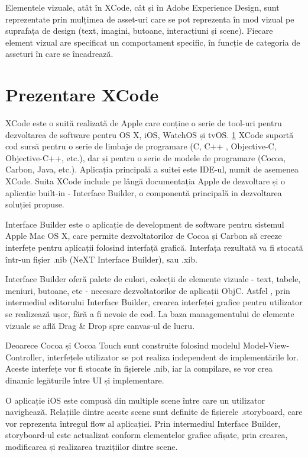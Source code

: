 Elementele vizuale, atât în XCode, cât și în Adobe Experience Design, sunt reprezentate prin mulțimea de asset-uri care se pot reprezenta în mod vizual pe suprafața de design (text, imagini, butoane, interacțiuni și scene). Fiecare element vizual are specificat un comportament specific, în funcție de categoria de asseturi în care se încadrează.

\section{Prezentare XCode}

XCode este o suită realizată de Apple care conține o serie de tool-uri pentru dezvoltarea de software pentru OS X, iOS, WatchOS și tvOS. \ref{} XCode suportă cod sursă pentru o serie de limbaje de programare (C, C++ , Objective-C, Objective-C++, etc.), dar și pentru o serie de modele de programare (Cocoa, Carbon, Java, etc.). Aplicația principală a suitei este IDE-ul, numit de asemenea XCode. Suita XCode include pe lângă documentația Apple de dezvoltare și o aplicație built-in - Interface Builder, o componentă principală in dezvoltarea soluției propuse.

Interface Builder este o aplicație de development de software pentru sistemul Apple Mac OS X, care permite dezvoltatorilor de Cocoa și Carbon să creeze interfețe pentru aplicații folosind interfață grafică. Interfața rezultată va fi stocată într-un fișier .nib (NeXT Interface Builder), sau .xib.

Interface Builder oferă palete de culori, colecții de elemente vizuale - text, tabele, meniuri, butoane, etc - necesare dezvoltatorilor de aplicații ObjC. Astfel , prin intermediul editorului Interface Builder, crearea interfeței grafice pentru utilizator se realizează ușor, fără a fi nevoie de cod. La baza managementului de elemente vizuale se află Drag & Drop spre canvas-ul de lucru. 

Deoarece Cocoa și Cocoa Touch sunt construite folosind modelul Model-View-Controller, interfețele utilizator se pot realiza independent de implementările lor. Aceste interfețe vor fi stocate în fișierele .nib, iar la compilare, se vor crea dinamic legăturile între UI și implementare.

O aplicație iOS este compusă din multiple scene între care un utilizator navighează. Relațiile dintre aceste scene sunt definite de fișierele .storyboard, care vor reprezenta întregul flow al aplicației. Prin intermediul Interface Builder, storyboard-ul este actualizat conform elementelor grafice afișate, prin crearea, modificarea și realizarea trazițiilor dintre scene.

